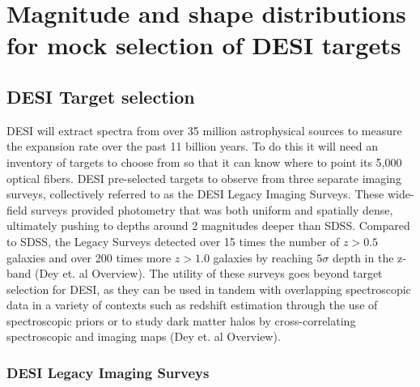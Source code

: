 \chapter{Magnitude and shape distributions for mock selection of DESI targets}

\section{DESI Target selection}


DESI will extract spectra from over 35 million astrophysical sources to measure the expansion rate over the past 11 billion years. To do this it will need an inventory of targets to choose from so that it can know where to point its 5,000 optical fibers. DESI pre-selected targets to observe from three separate imaging surveys, collectively referred to as the DESI Legacy Imaging Surveys. These wide-field surveys provided photometry that was both uniform and spatially dense, ultimately pushing to depths around 2 magnitudes deeper than SDSS.  Compared to SDSS, the Legacy Surveys detected over 15 times the number of $z>0.5$ galaxies and over 200 times more $z>1.0$ galaxies by reaching $5\sigma$ depth in the z-band (Dey et. al Overview). The utility of these surveys goes beyond target selection for DESI, as they can be used in tandem with overlapping spectroscopic data in a variety of contexts such as redshift estimation through the use of spectroscopic priors or to study dark matter halos by cross-correlating spectroscopic and imaging maps (Dey et. al Overview).

\subsection{DESI Legacy Imaging Surveys}

